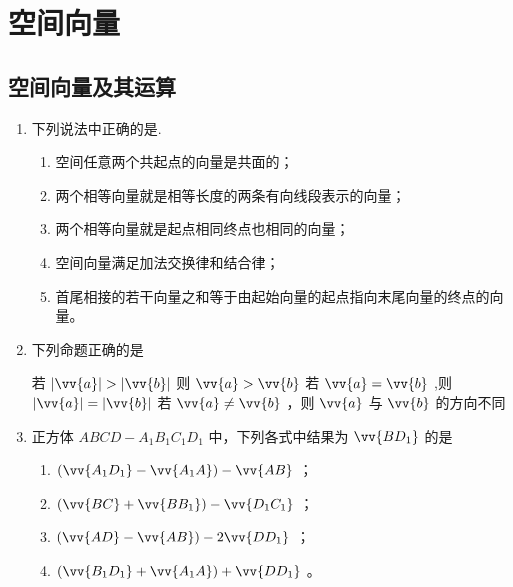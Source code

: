\chapter*{空间向量}

\section*{空间向量及其运算}

\begin{enumerate}

\item 下列说法中正确的是.
    \begin{enumerate}
        \item 空间任意两个共起点的向量是共面的；
        \item 两个相等向量就是相等长度的两条有向线段表示的向量；
        \item 两个相等向量就是起点相同终点也相同的向量；
        \item 空间向量满足加法交换律和结合律；
        \item 首尾相接的若干向量之和等于由起始向量的起点指向末尾向量的终点的向量。
        
    \end{enumerate}

    \item 下列命题正确的是

    {若 $\left| \vv{a}\right|  > \left| \vv{b}\right|$ 则 $\vv{a} > \vv{b}$}
    {若 $\vv{a} = \vv{b}$ ,则 $\left| \vv{a}\right|  = \left| \vv{b}\right|$ }
    {若 $\vv{a} \neq  \vv{b}$ ，则 $\vv{a}$ 与 $\vv{b}$ 的方向不同}


    \item 正方体 ${ABCD} - {A}_{1}{B}_{1}{C}_{1}{D}_{1}$ 中，下列各式中结果为 $\vv{B{D}_{1}}$ 的是
    \begin{enumerate}
        \item $\left( {\vv{{A}_{1}{D}_{1}} - \vv{{A}_{1}A}}\right)  - \vv{AB}$ ；
        \item $\left( {\vv{BC} + \vv{B{B}_{1}}}\right)  - \vv{{D}_{1}{C}_{1}}$ ；
        \item $\left( {\vv{AD} - \vv{AB}}\right)  - 2\vv{D{D}_{1}}$ ；
        \item  $\left( {\vv{{B}_{1}{D}_{1}} + \vv{{A}_{1}A}}\right)  + \vv{D{D}_{1}}$ 。
    \end{enumerate}



\end{enumerate}
